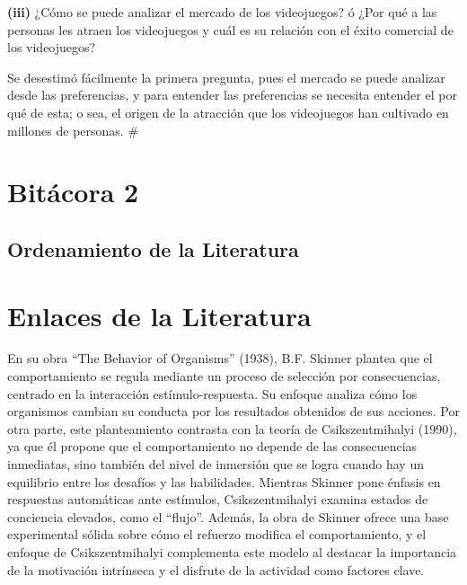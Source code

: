\documentclass[
  letterpaper,
  DIV=11,
  numbers=noendperiod]{scrreprt}
\begin{document}
\textbf{(iii)} ¿Cómo se puede analizar el mercado de los videojuegos? ó
¿Por qué a las personas les atraen los videojuegos y cuál es su relación
con el éxito comercial de los videojuegos?

Se desestimó fácilmente la primera pregunta, pues el mercado se puede
analizar desde las preferencias, y para entender las preferencias se
necesita entender el por qué de esta; o sea, el origen de la atracción
que los videojuegos han cultivado en millones de personas. \#


\hypertarget{bituxe1cora-2}{%
\chapter{Bitácora 2}\label{bituxe1cora-2}}

\hypertarget{ordenamiento-de-la-literatura}{%
\section{Ordenamiento de la
Literatura}\label{ordenamiento-de-la-literatura}}


\hypertarget{enlaces-de-la-literatura}{%
\chapter{Enlaces de la Literatura}\label{enlaces-de-la-literatura}}

En su obra ``The Behavior of Organisms'' (1938), B.F. Skinner plantea
que el comportamiento se regula mediante un proceso de selección por
consecuencias, centrado en la interacción estímulo-respuesta. Su enfoque
analiza cómo los organismos cambian su conducta por los resultados
obtenidos de sus acciones. Por otra parte, este planteamiento contrasta
con la teoría de Csikszentmihalyi (1990), ya que él propone que el
comportamiento no depende de las consecuencias inmediatas, sino también
del nivel de inmersión que se logra cuando hay un equilibrio entre los
desafíos y las habilidades. Mientras Skinner pone énfasis en respuestas
automáticas ante estímulos, Csikszentmihalyi examina estados de
conciencia elevados, como el ``flujo''. Además, la obra de Skinner
ofrece una base experimental sólida sobre cómo el refuerzo modifica el
comportamiento, y el enfoque de Csikszentmihalyi complementa este modelo
al destacar la importancia de la motivación intrínseca y el disfrute de
la actividad como factores clave.
\end{document}
